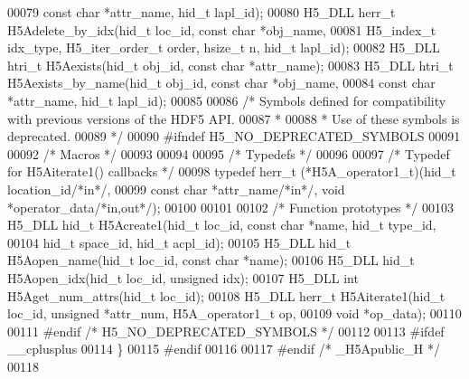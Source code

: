 \begin{DoxyCode}
00079     \textcolor{keyword}{const} \textcolor{keywordtype}{char} *attr\_name, hid\_t lapl\_id);
00080 H5\_DLL herr\_t  H5Adelete\_by\_idx(hid\_t loc\_id, \textcolor{keyword}{const} \textcolor{keywordtype}{char} *obj\_name,
00081     H5\_index\_t idx\_type, H5\_iter\_order\_t order, hsize\_t n, hid\_t lapl\_id);
00082 H5\_DLL htri\_t H5Aexists(hid\_t obj\_id, \textcolor{keyword}{const} \textcolor{keywordtype}{char} *attr\_name);
00083 H5\_DLL htri\_t H5Aexists\_by\_name(hid\_t obj\_id, \textcolor{keyword}{const} \textcolor{keywordtype}{char} *obj\_name,
00084     \textcolor{keyword}{const} \textcolor{keywordtype}{char} *attr\_name, hid\_t lapl\_id);
00085 
00086 \textcolor{comment}{/* Symbols defined for compatibility with previous versions of the HDF5 API.}
00087 \textcolor{comment}{ *}
00088 \textcolor{comment}{ * Use of these symbols is deprecated.}
00089 \textcolor{comment}{ */}
00090 \textcolor{preprocessor}{#ifndef H5\_NO\_DEPRECATED\_SYMBOLS}
00091 
00092 \textcolor{comment}{/* Macros */}
00093 
00094 
00095 \textcolor{comment}{/* Typedefs */}
00096 
00097 \textcolor{comment}{/* Typedef for H5Aiterate1() callbacks */}
00098 \textcolor{keyword}{typedef} herr\_t (*H5A\_operator1\_t)(hid\_t location\_id\textcolor{comment}{/*in*/},
00099     \textcolor{keyword}{const} \textcolor{keywordtype}{char} *attr\_name\textcolor{comment}{/*in*/}, \textcolor{keywordtype}{void} *operator\_data\textcolor{comment}{/*in,out*/});
00100 
00101 
00102 \textcolor{comment}{/* Function prototypes */}
00103 H5\_DLL hid\_t   H5Acreate1(hid\_t loc\_id, \textcolor{keyword}{const} \textcolor{keywordtype}{char} *name, hid\_t type\_id,
00104     hid\_t space\_id, hid\_t acpl\_id);
00105 H5\_DLL hid\_t   H5Aopen\_name(hid\_t loc\_id, \textcolor{keyword}{const} \textcolor{keywordtype}{char} *name);
00106 H5\_DLL hid\_t   H5Aopen\_idx(hid\_t loc\_id, \textcolor{keywordtype}{unsigned} idx);
00107 H5\_DLL \textcolor{keywordtype}{int}     H5Aget\_num\_attrs(hid\_t loc\_id);
00108 H5\_DLL herr\_t  H5Aiterate1(hid\_t loc\_id, \textcolor{keywordtype}{unsigned} *attr\_num, H5A\_operator1\_t op,
00109     \textcolor{keywordtype}{void} *op\_data);
00110 
00111 \textcolor{preprocessor}{#endif }\textcolor{comment}{/* H5\_NO\_DEPRECATED\_SYMBOLS */}\textcolor{preprocessor}{}
00112 
00113 \textcolor{preprocessor}{#ifdef \_\_cplusplus}
00114 \}
00115 \textcolor{preprocessor}{#endif}
00116 
00117 \textcolor{preprocessor}{#endif }\textcolor{comment}{/* \_H5Apublic\_H */}\textcolor{preprocessor}{}
00118 
\end{DoxyCode}
